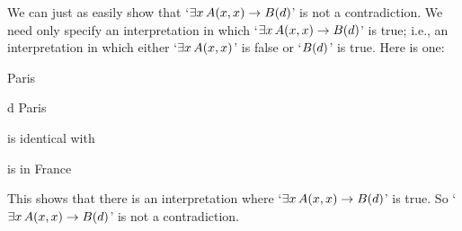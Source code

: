 We can just as easily show that `$\exists x\,\mathord{A}(x,x) \rightarrow \mathord{B}(d)$' is not a contradiction. We need only specify an interpretation in which `$\exists x\,\mathord{A}(x,x) \rightarrow \mathord{B}(d)$' is true; i.e., an interpretation in which either `$\exists x\, \mathord{A}(x,x)$' is false or `$\mathord{B}(d)$' is true. Here is one:
	\begin{ekey}
		\item[\text{domain}] Paris
		\item[d] Paris
		\item[\atom{A}{x,y}]  is identical with 
		\item[\atom{B}{x}]  is in France
	\end{ekey}
This shows that there is an interpretation where `$\exists x\,\mathord{A}(x,x) \rightarrow \mathord{B}(d)$' is true. So `$\exists x\, \mathord{A}(x,x) \rightarrow \mathord{B}(d)$' is not a contradiction.

